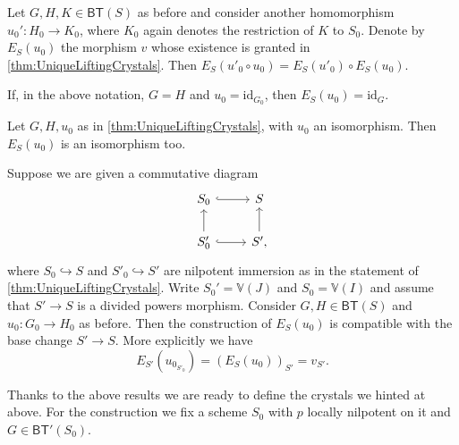 \begin{cor}\label{thm:M4.2.4.1}
	Let $G, H, K \in \mathsf{BT}(S)$ as before and consider another
	homomorphism $u_0'\colon H_0 \to K_0$, where $K_0$ again denotes
	the restriction of $K$ to $S_0$.
	Denote by $E_S(u_0)$ the morphism $v$ whose existence is granted in
	\cref{thm:UniqueLiftingCrystals}.
	Then $E_S(u'_0 \circ u_0) = E_S(u'_0) \circ E_S(u_0)$.
\end{cor} 


\begin{cor}\label{thm:M4.2.4.2}
	If, in the above notation, $G = H$ and $u_0 = \mathrm{id}_{ G_0 }$,
	then $E_S(u_0) = \mathrm{id}_{ G }$.
\end{cor} 


\begin{cor}\label{thm:M4.2.4.3}
	Let $G,H, u_0$ as in \cref{thm:UniqueLiftingCrystals},
	with $u_0$ an isomorphism.
	Then $E_S(u_0)$ is an isomorphism too.
\end{cor} 


\begin{cor}\label{thm:M4.2.4.4}
	Suppose we are given a commutative diagram
	\begin{equation*}
	\begin{tikzcd}
		S_0 \arrow[r, "", hookrightarrow] &
		S \\
		S_0' \arrow[u, "", rightarrow] 
		\arrow[r, "", hookrightarrow] &
		S' \arrow[u, "", rightarrow] 
	,\end{tikzcd}
	\end{equation*}
	where $S_0 \hookrightarrow S$ and $S'_0 \hookrightarrow S'$ are
	nilpotent immersion as in the statement of \cref{thm:UniqueLiftingCrystals}.
	Write $S_0' = \mathbb{V}(J)$ and $S_0 = \mathbb{V}(I)$
	and assume that $S' \to S$ is a divided powers morphism.
	Consider $G,H \in \mathsf{BT}(S)$ and $u_0\colon G_0 \to H_0$ as before.
	Then the construction of $E_S(u_0)$ is compatible with the base
	change $S' \to S$.
	More explicitly we have
	\begin{equation*}
		E_{S'}(u_{0_{S'_0}}) =
		\left( E_S(u_0) \right)_{S'} = v_{S'}
	.\end{equation*}
\end{cor} 


\noindent
Thanks to the above results we are ready to define the crystals we hinted at above.
For the construction we fix a scheme $S_0$ with $p$ locally
nilpotent on it and $G \in \mathsf{BT}'(S_0)$.


